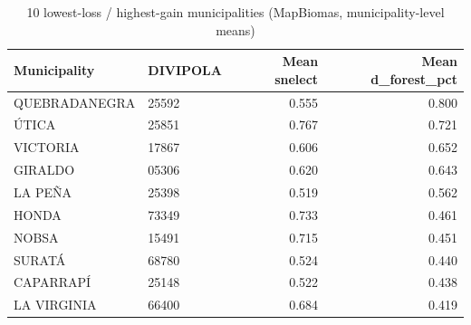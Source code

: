 \begin{table}

\caption{10 lowest-loss / highest-gain municipalities (MapBiomas, municipality-level means)}
\centering
\begin{tabular}[t]{llrr}
\toprule
Municipality & DIVIPOLA & Mean snelect & Mean d\_forest\_pct\\
\midrule
QUEBRADANEGRA & 25592 & 0.555 & 0.800\\
ÚTICA & 25851 & 0.767 & 0.721\\
VICTORIA & 17867 & 0.606 & 0.652\\
GIRALDO & 05306 & 0.620 & 0.643\\
LA PEÑA & 25398 & 0.519 & 0.562\\
\addlinespace
HONDA & 73349 & 0.733 & 0.461\\
NOBSA & 15491 & 0.715 & 0.451\\
SURATÁ & 68780 & 0.524 & 0.440\\
CAPARRAPÍ & 25148 & 0.522 & 0.438\\
LA VIRGINIA & 66400 & 0.684 & 0.419\\
\bottomrule
\end{tabular}
\end{table}
